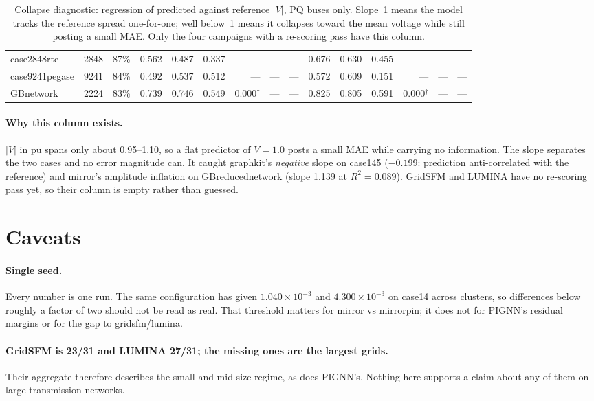 \documentclass[10pt]{article}
\begin{document}
\begin{landscape}
\begin{table}[H]
\begin{tabular}{lrr rrrrrr rrrrrr}
case2848rte & 2848 & 87\% & 0.562 & 0.487 & 0.337 & --- & --- & --- & 0.676 & 0.630 & 0.455 & --- & --- & --- \\
case9241pegase & 9241 & 84\% & 0.492 & 0.537 & 0.512 & --- & --- & --- & 0.572 & 0.609 & 0.151 & --- & --- & --- \\
GBnetwork & 2224 & 83\% & 0.739 & 0.746 & 0.549 & 0.000$^\dagger$ & --- & --- & 0.825 & 0.805 & 0.591 & 0.000$^\dagger$ & --- & --- \\
\bottomrule
\end{tabular}
\caption{Collapse diagnostic: regression of predicted against reference $|V|$, PQ buses only. Slope~1 means the model tracks the reference spread one-for-one; well below~1 means it collapses toward the mean voltage while still posting a small MAE. Only the four campaigns with a re-scoring pass have this column.}
\end{table}
\end{landscape}

\paragraph{Why this column exists.} $|V|$ in pu spans only about 0.95--1.10, so
a flat predictor of $V = 1.0$ posts a small MAE while carrying no information.
The slope separates the two cases and no error magnitude can. It caught
graphkit's \emph{negative} slope on case145 ($-0.199$: prediction
anti-correlated with the reference) and mirror's amplitude inflation on
GBreducednetwork (slope 1.139 at $R^2 = 0.089$). GridSFM and LUMINA have no
re-scoring pass yet, so their column is empty rather than guessed.

\section{Caveats}

\paragraph{Single seed.} Every number is one run. The same configuration has
given $1.040\times10^{-3}$ and $4.300\times10^{-3}$ on case14 across clusters,
so differences below roughly a factor of two should not be read as real. That
threshold matters for mirror vs mirrorpin; it does not for PIGNN's residual
margins or for the gap to gridsfm/lumina.

\paragraph{GridSFM is 23/31 and LUMINA 27/31; the missing ones are the largest
grids.} Their aggregate therefore describes the small and mid-size regime, as
does PIGNN's. Nothing here supports a claim about any of them on large
transmission networks.
\end{document}

